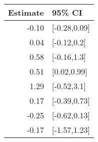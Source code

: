 \begin{tabular}{rl}
  \hline
Estimate & 95\% CI \\ 
  \hline
-0.10 & [-0.28,0.09] \\ 
  0.04 & [-0.12,0.2] \\ 
  0.58 & [-0.16,1.3] \\ 
  0.51 & [0.02,0.99] \\ 
  1.29 & [-0.52,3.1] \\ 
  0.17 & [-0.39,0.73] \\ 
  -0.25 & [-0.62,0.13] \\ 
  -0.17 & [-1.57,1.23] \\ 
   \hline
\end{tabular}

